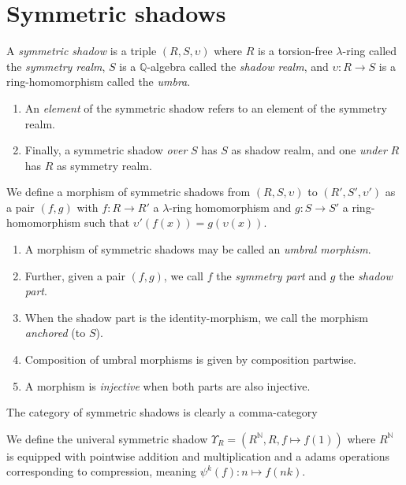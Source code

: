
\section{Symmetric shadows}

\begin{definition}
  A \emph{symmetric shadow} is a triple $(R, S, \upsilon)$ where $R$ is a torsion-free $\lambda$-ring called the \emph{symmetry realm}, $S$ is a $\mathbb{Q}$-algebra called the \emph{shadow realm}, and $\upsilon: R \to S$ is a ring-homomorphism called the \emph{umbra}. 
  \begin{enumerate}
    \item An \emph{element} of the symmetric shadow refers to an element of the symmetry realm. 
    \item Finally, a symmetric shadow \emph{over} $S$ has $S$ as shadow realm, and one \emph{under} $R$ has $R$ as symmetry realm.
  \end{enumerate}
\end{definition}

\begin{definition}
  We define a morphism of symmetric shadows from $(R, S, \upsilon)$ to $(R', S', \upsilon')$ as a pair $(f, g)$ with $f : R \to R'$ a $\lambda$-ring homomorphism and $g : S \to S'$ a ring-homomorphism such that $\upsilon'(f(x)) = g(\upsilon(x))$. 
  \begin{enumerate}
    \item A morphism of symmetric shadows may be called an \emph{umbral morphism}. 
    \item Further, given a pair $(f, g)$, we call $f$ the \emph{symmetry part} and $g$ the \emph{shadow part}. 
    \item When the shadow part is the identity-morphism, we call the morphism \emph{anchored} (to $S$). 
    \item Composition of umbral morphisms is given by composition partwise. 
    \item A morphism is \emph{injective} when both parts are also injective. 
  \end{enumerate}
\end{definition}

\begin{remark}
  The category of symmetric shadows is clearly a comma-category
\end{remark}

\begin{definition}
  We define the univeral symmetric shadow $\Upsilon_R = (R^{\mathbb{N}}, R, f \mapsto f(1))$ where $R^{\mathbb{N}}$ is equipped with pointwise addition and multiplication and a adams operations corresponding to compression, meaning $\psi^k(f) : n \mapsto f(nk)$.
\end{definition}

